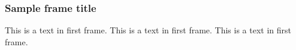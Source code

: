\documentclass{beamer}
\title{}
\author{Paweł Chojnacki}
\institute{}
\date{2018}
\begin{document}
 
\frame{\titlepage}
 
\begin{frame}
\frametitle{Sample frame title}
This is a text in first frame. This is a text in first frame. This is a text in first frame.
\end{frame}
 
\end{document}
